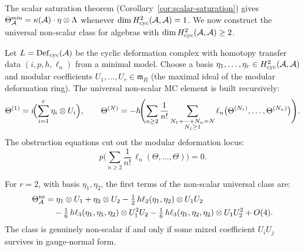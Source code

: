 The scalar saturation theorem
(Corollary~\ref{cor:scalar-saturation}) gives
$\Theta_{\mathcal{A}}^{\min} = \kappa(\mathcal{A}) \cdot \eta \otimes \Lambda$
whenever $\dim H^2_{\mathrm{cyc}}(\mathcal{A},\mathcal{A}) = 1$.  We now
construct the universal non-scalar class for algebras with
$\dim H^2_{\mathrm{cyc}}(\mathcal{A},\mathcal{A}) \geq 2$.

\begin{construction}
\label{constr:non-scalar-hpt}
Let $L = \operatorname{Def}_{\mathrm{cyc}}(\mathcal{A})$ be the cyclic deformation complex
with homotopy transfer data $(i,p,h,\ell_n)$ from a
minimal model.  Choose a basis
$\eta_1, \ldots, \eta_r \in H^2_{\mathrm{cyc}}(\mathcal{A},\mathcal{A})$
and modular coefficients $U_1, \ldots, U_r \in \mathfrak{m}_{R}$
(the maximal ideal of the modular deformation ring).
The universal non-scalar MC element is built recursively:
\begin{equation}\label{eq:hpt-nonscalar-recursion}
\Theta^{(1)} = i\!\Bigl(\sum_{i=1}^r \eta_i \otimes U_i\Bigr),
\qquad
\Theta^{(N)} = -h\!\Biggl(
  \sum_{n \geq 2} \frac{1}{n!}
  \sum_{\substack{N_1 + \cdots + N_n = N \\ N_j \geq 1}}
  \ell_n\bigl(\Theta^{(N_1)}, \ldots, \Theta^{(N_n)}\bigr)
\Biggr).
\end{equation}
The obstruction equations cut out the modular deformation locus:
\[
p\!\Biggl(
  \sum_{n \geq 2} \frac{1}{n!}\,
  \ell_n(\Theta, \ldots, \Theta)
\Biggr) = 0.
\]
\end{construction}

\begin{example}
\label{ex:two-channel-nonscalar}
For $r = 2$, with basis $\eta_1, \eta_2$, the first
terms of the non-scalar universal class are:
\begin{equation}\label{eq:two-channel-explicit}
\begin{split}
\Theta_{\mathcal{A}}^{\mathrm{ns}}
&= \eta_1 \otimes U_1
  + \eta_2 \otimes U_2
  - \tfrac{1}{2}\,h\ell_2(\eta_1,\eta_2)
    \otimes U_1 U_2 \\
&\quad - \tfrac{1}{6}\,h\ell_3(\eta_1,\eta_1,\eta_2)
    \otimes U_1^2 U_2
  - \tfrac{1}{6}\,h\ell_3(\eta_1,\eta_2,\eta_2)
    \otimes U_1 U_2^2
  + O(4).
\end{split}
\end{equation}
The class is genuinely non-scalar if and only if some mixed
coefficient $U_i U_j$ survives in gauge-normal form.
\end{example}


